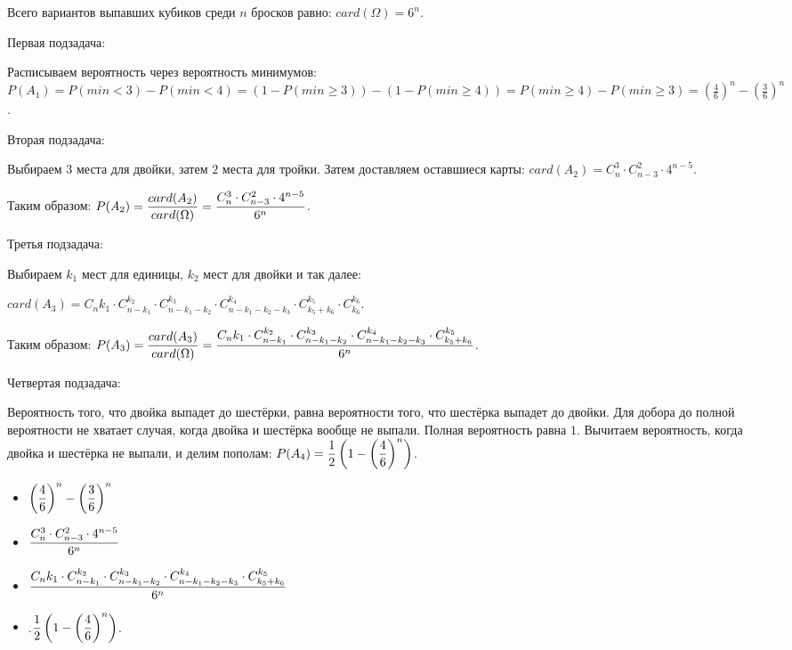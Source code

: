 \documentclass{article}
\begin{document}
\begin{enumerate}
    \solution{}

    Всего вариантов выпавших кубиков среди $n$ бросков равно: $card(\Omega) = 6 ^ n$.

    Первая подзадача:

    Расписываем вероятность через вероятность минимумов: $P(A_1) = P(min < 3) - P(min < 4) = (1 - P(min \geq 3)) - (1 - P(min \geq 4)) = P(min \geq 4) - P(min \geq 3) = \left(\frac{4}{6}\right)^n - \left(\frac{3}{6}\right) ^ n$.

    Вторая подзадача:

    Выбираем $3$ места для двойки, затем $2$ места для тройки. Затем доставляем оставшиеся карты: $card(A_2) = C_n^3 \cdot C_{n - 3}^2 \cdot 4 ^ {n - 5}$.

    Таким образом: $\displaystyle{P(A_2) = \frac{card(A_2)}{card(\Omega)} = \frac{C_n^3 \cdot C_{n - 3}^2 \cdot 4 ^ {n - 5}}{6 ^ n}}$.

    Третья подзадача:

    Выбираем $k_1$ мест для единицы, $k_2$ мест для двойки и так далее:
    
    $card(A_3) = C_n{k_1} \cdot C_{n - k_1}^{k_2} \cdot C_{n - k_1 - k_2}^{k_3} \cdot C_{n - k_1 - k_2 - k_3}^{k_4} \cdot C_{k_5 + k_6}^{k_5} \cdot C_{k_6}^{k_6}$.

    Таким образом: $\displaystyle{P(A_3) = \frac{card(A_3)}{card(\Omega)} = \frac{C_n{k_1} \cdot C_{n - k_1}^{k_2} \cdot C_{n - k_1 - k_2}^{k_3} \cdot C_{n - k_1 - k_2 - k_3}^{k_4} \cdot C_{k_5 + k_6}^{k_5}}{6 ^ n}}$.

    Четвертая подзадача:

    Вероятность того, что двойка выпадет до шестёрки, равна вероятности того, что шестёрка выпадет до двойки. Для добора до полной вероятности не хватает случая, когда двойка и шестёрка вообще не выпали. Полная вероятность равна $1$. Вычитаем вероятность, когда двойка и шестёрка не выпали, и делим пополам: $\displaystyle{P(A_4) = \frac{1}{2} \left(1 - \left(\frac{4}{6}\right) ^ n \right)}$.

    \answer{}

    \begin{itemize}
        \item $\displaystyle{\left(\frac{4}{6}\right)^n - \left(\frac{3}{6}\right) ^ n}$
        \item $\displaystyle{ \frac{C_n^3 \cdot C_{n - 3}^2 \cdot 4 ^ {n - 5}}{6 ^ n}}$
        \item $\displaystyle{\frac{C_n{k_1} \cdot C_{n - k_1}^{k_2} \cdot C_{n - k_1 - k_2}^{k_3} \cdot C_{n - k_1 - k_2 - k_3}^{k_4} \cdot C_{k_5 + k_6}^{k_5}}{6 ^ n}}$
        \item .$\displaystyle{\frac{1}{2} \left(1 - \left(\frac{4}{6}\right) ^ n \right)}$.
    \end{itemize}


\end{enumerate}
\end{document}
